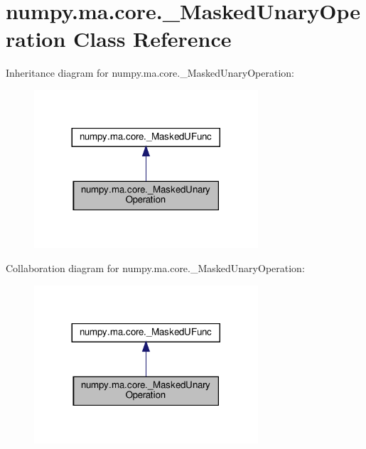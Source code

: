 \hypertarget{classnumpy_1_1ma_1_1core_1_1__MaskedUnaryOperation}{}\section{numpy.\+ma.\+core.\+\_\+\+Masked\+Unary\+Operation Class Reference}
\label{classnumpy_1_1ma_1_1core_1_1__MaskedUnaryOperation}


Inheritance diagram for numpy.\+ma.\+core.\+\_\+\+Masked\+Unary\+Operation\+:
\nopagebreak
\begin{figure}[H]
\begin{center}
\leavevmode
\includegraphics[width=236pt]{classnumpy_1_1ma_1_1core_1_1__MaskedUnaryOperation__inherit__graph}
\end{center}
\end{figure}


Collaboration diagram for numpy.\+ma.\+core.\+\_\+\+Masked\+Unary\+Operation\+:
\nopagebreak
\begin{figure}[H]
\begin{center}
\leavevmode
\includegraphics[width=236pt]{classnumpy_1_1ma_1_1core_1_1__MaskedUnaryOperation__coll__graph}
\end{center}
\end{figure}
